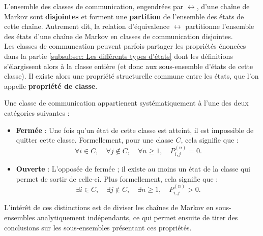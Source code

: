 \documentclass{article}
\begin{document}
L'ensemble des classes de communication, engendrées par $\leftrightarrow$, d'une chaîne de Markov sont \textbf{disjointes} et forment une \textbf{partition} de l'ensemble des états de cette chaîne.
Autrement dit, la relation d'équivalence $\leftrightarrow$ partitionne l'ensemble des états d'une chaîne de Markov en classes de communication disjointes. \\

Les classes de communcation peuvent parfois partager les propriétés énoncées dans la partie \ref{subsubsec: Les différents types d'états} dont les définitions s'élargissent alors à la classe entière (et donc aux sous-ensemble d'états de cette classe). Il existe alors une propriété structurelle commune entre les états, que l'on appelle \textbf{propriété de classe}. \\

\begin{tcolorbox}[colback=white,colframe=blue!80!black,title=Qualificatif ouvert/fermé pour une classe de communication]
Une classe de communication appartienent systématiquement à l'une des deux catégories suivantes :
\begin{itemize}
    \item \textbf{Fermée} : Une fois qu'un état de cette classe est atteint, il est impossible de quitter cette classe. Formellement, pour une classe $C$, cela signifie que :
        \[
        \forall i \in C, \quad \forall j \notin C, \quad \forall n \geq 1, \quad P_{i,j}^{(n)} = 0.
        \]
    \item \textbf{Ouverte} : L'opposée de fermée ; il existe au moins un état de la classe qui permet de sortir de celle-ci. Plus formellement, cela signifie que :
        \[
        \exists i \in C, \quad \exists j \notin C, \quad \exists n \geq 1, \quad P_{i,j}^{(n)} > 0.
        \]
\end{itemize}
\end{tcolorbox}

L'intérêt de ces distinctions est de diviser les chaînes de Markov en sous-ensembles analytiquement indépendants, ce qui permet ensuite de tirer des conclusions sur les sous-ensembles présentant ces propriétés. \\
\end{document}
